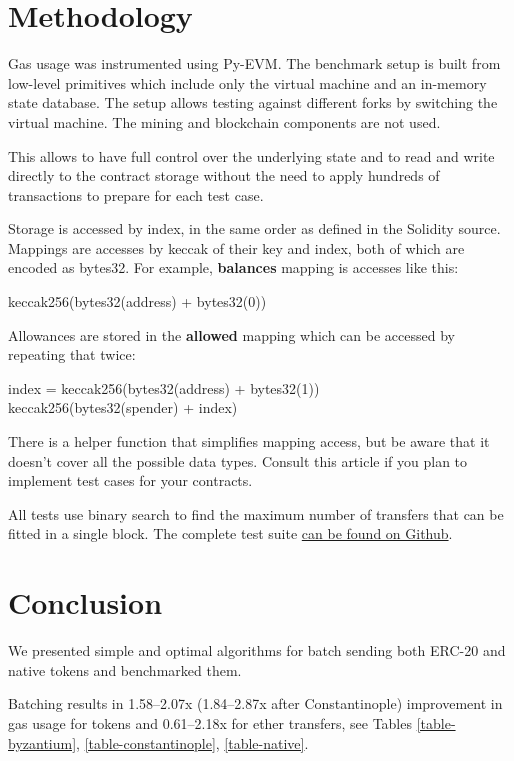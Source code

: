 \documentclass[12pt]{article}
\begin{document}
\section{Methodology}

Gas usage was instrumented using Py-EVM\cite{pyevm}.
The benchmark setup is built from low-level primitives which include only the virtual machine and an in-memory state database.
The setup allows testing against different forks by switching the virtual machine.
The mining and blockchain components are not used.

This allows to have full control over the underlying state and to read and write directly to the contract storage without the need to apply hundreds of transactions to prepare for each test case.

Storage is accessed by index, in the same order as defined in the Solidity source.
Mappings are accesses by keccak of their key and index, both of which are encoded as bytes32.
For example, \textbf{balances} mapping is accesses like this:
\begin{center}
	keccak256(bytes32(address) + bytes32(0))	
\end{center}

Allowances are stored in the \textbf{allowed} mapping which can be accessed by repeating that twice:
\begin{center}
index = keccak256(bytes32(address) + bytes32(1)) \\
keccak256(bytes32(spender) + index)	
\end{center}

There is a helper function that simplifies mapping access, but be aware that it doesn't cover all the possible data types.
Consult this article\cite{read-storage} if you plan to implement test cases for your contracts.

All tests use binary search to find the maximum number of transfers that can be fitted in a single block.
The complete test suite \href{https://github.com/banteg/disperse-reseach}{can be found on Github}.

\section{Conclusion}

We presented simple and optimal algorithms for batch sending both ERC-20 and native tokens and benchmarked them.

Batching results in 1.58--2.07x (1.84--2.87x after Constantinople) improvement in gas usage for tokens and 0.61--2.18x for ether transfers, see Tables \ref{table-byzantium}, \ref{table-constantinople}, \ref{table-native}.
\end{document}
